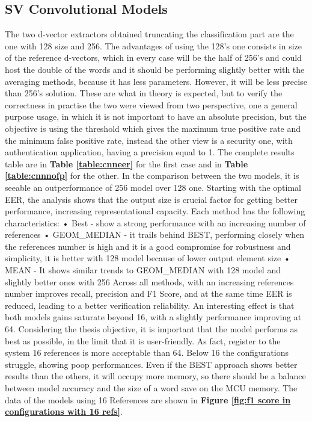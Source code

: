 \subsection{SV Convolutional Models}
\label{subsec:sv convolutional models}
The two d-vector extractors obtained truncating the classification part are the one with 128 size and 256. The advantages of using the 128's one consists in size of the reference d-vectors, which in every case will be the half of 256's and could host the double of the words and it should be performing slightly better with the averaging methods, because it has less parameters. However, it will be less precise than 256's solution. These are what in theory is expected, but to verify the correctness in practise the two were viewed from two perspective, one a general purpose usage, in which it is not important to have an absolute precision, but the objective is using the threshold which gives the maximum true positive rate and the minimum false positive rate, instead the other view is a security one, with authentication application, having a precision equal to 1. The complete results table are in \textbf{Table \ref{table:cnneer}} for the first case and in \textbf{Table \ref{table:cnnnofp}} for the other. In the comparison between the two models, it is seeable an outperformance of 256 model over 128 one. Starting with the optimal EER, the analysis shows that the output size is crucial factor for getting better performance, increasing representational capacity. Each method has the following characteristics:\newline
• Best - show a strong performance with an increasing number of references\newline
• GEOM\_MEDIAN - it trails behind BEST, performing closely when the references number is high and it is a good compromise for robustness and simplicity, it is better with 128 model because of lower output element size\newline
• MEAN - It shows similar trends to GEOM\_MEDIAN with 128 model and slightly better ones with 256\newline
Across all methods, with an increasing references number improves recall, precision and F1 Score, and at the same time EER is reduced, leading to a better verification reliability. An interesting effect is that both models gains saturate beyond 16, with a slightly performance improving at 64. Considering the thesis objective, it is important that the model performs as best as possible, in the limit that it is user-friendly. As fact, register to the system 16 references is more acceptable than 64. Below 16 the configurations struggle, showing poop performances. Even if the BEST approach shows better results than the others, it will occupy more memory, so there should be a balance between model accuracy and the size of a word save on the MCU memory. The data of the models using 16 References are shown in \textbf{Figure \ref{fig:f1 score in configurations with 16 refs}}. 
